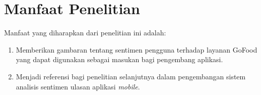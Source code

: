 \section{Manfaat Penelitian}

Manfaat yang diharapkan dari penelitian ini adalah:

\begin{enumerate}
  \item Memberikan gambaran tentang sentimen pengguna terhadap layanan GoFood yang dapat digunakan sebagai masukan bagi pengembang aplikasi.
  \item Menjadi referensi bagi penelitian selanjutnya dalam pengembangan sistem analisis sentimen ulasan aplikasi \emph{mobile}.
\end{enumerate}
